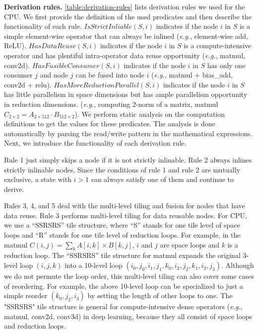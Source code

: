 \textbf{Derivation rules.}
\autoref{table:derivation-rules} lists derivation rules we used for the CPU.
We first provide the definition of the used predicates and then describe the functionality of each rule.
$IsStrictInliable(S, i)$ indicates if the node $i$ in $S$ is a simple element-wise operator that can always be inlined (\textit{e.g.}, element-wise add, ReLU). $HasDataReuse(S, i)$ indicates if the node $i$ in $S$ is a compute-intensive operator and has plentiful intra-operator data reuse opportunity (\textit{e.g.}, matmul, conv2d). $HasFusibleConsumer(S, i)$ indicates if the node $i$ in $S$ has only one consumer $j$ and node $j$ can be fused into node $i$ (\textit{e.g.}, matmul + bias\_add, conv2d + relu). $HasMoreReductionParallel(S, i)$ indicates if the node $i$ in $S$ has little parallelism in space dimensions but has ample parallelism opportunity in reduction dimensions.  (\textit{e.g.}, computing 2-norm of a matrix, matmul $C_{2\times 2} = A_{2\times 512} \cdot B_{512 \times 2}$).
We perform static analysis on the computation definitions to get the values for these predicates.
The analysis is done automatically by parsing the read/write pattern in the mathematical expressions.
Next, we introduce the functionality of each derivation rule.

Rule 1 just simply skips a node if it is not strictly inlinable. Rule 2 always inlines strictly inlinable nodes. Since the conditions of rule 1 and rule 2 are mutually exclusive, a state with $i>1$ can always satisfy one of them and continue to derive.

Rules 3, 4, and 5 deal with the multi-level tiling and fusion for nodes that have data reuse.
Rule 3 performs multi-level tiling for data reusable nodes. For CPU, we use a ``SSRSRS'' tile structure, where ``S'' stands for one tile level of space loops and ``R'' stands for one tile level of reduction loops. For example, in the matmul $C(i, j) = \sum_k A[i,k] \times B[k, j]$, $i$ and $j$ are space loops and $k$ is a reduction loop. The ``SSRSRS'' tile structure for matmul expands the original 3-level loop $(i, j, k)$ into a 10-level loop $(i_0, j_0, i_1, j_1, k_0, i_2, j_2, k_1, i_3, j_3)$. Although we do not permute the loop order, this multi-level tiling can also cover some cases of reordering.
For example, the above 10-level loop can be specialized to just a simple reorder $(k_0, j_2, i_3)$ by setting the length of other loops to one.
The "SSRSRS" tile structure is general for compute-intensive dense operators (\textit{e.g.}, matmul, conv2d, conv3d) in deep learning, because they all consist of space loops and reduction loops.

